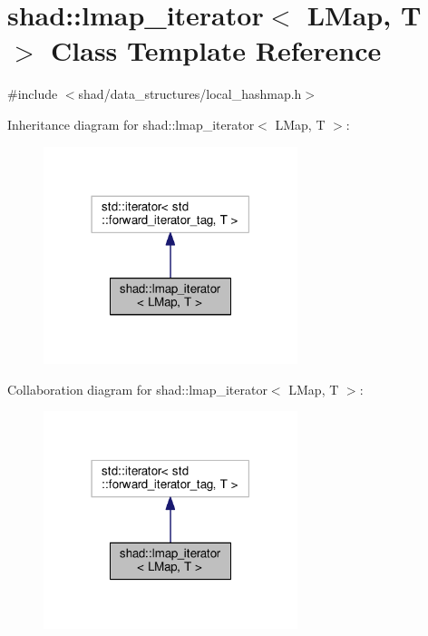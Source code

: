 \hypertarget{classshad_1_1lmap__iterator}{\section{shad\-:\-:lmap\-\_\-iterator$<$ L\-Map, T $>$ Class Template Reference}
\label{classshad_1_1lmap__iterator}
}


{\ttfamily \#include $<$shad/data\-\_\-structures/local\-\_\-hashmap.\-h$>$}



Inheritance diagram for shad\-:\-:lmap\-\_\-iterator$<$ L\-Map, T $>$\-:
\nopagebreak
\begin{figure}[H]
\begin{center}
\leavevmode
\includegraphics[width=210pt]{classshad_1_1lmap__iterator__inherit__graph}
\end{center}
\end{figure}


Collaboration diagram for shad\-:\-:lmap\-\_\-iterator$<$ L\-Map, T $>$\-:
\nopagebreak
\begin{figure}[H]
\begin{center}
\leavevmode
\includegraphics[width=210pt]{classshad_1_1lmap__iterator__coll__graph}
\end{center}
\end{figure}
